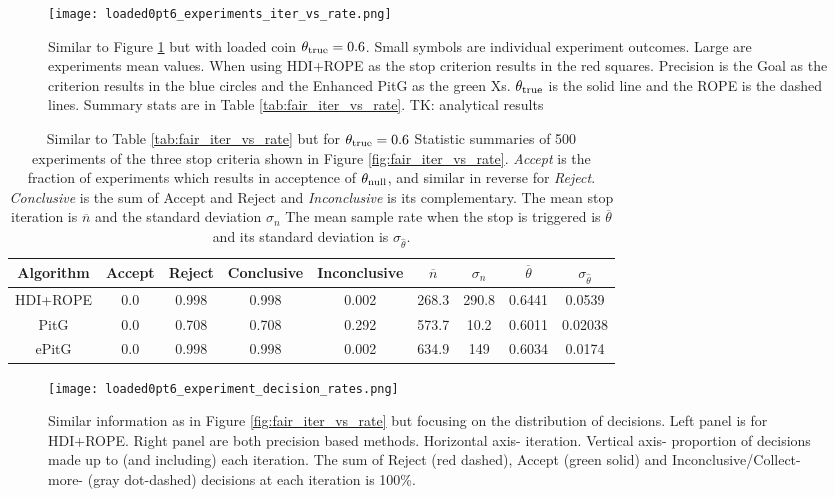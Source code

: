 \begin{figure}[h!]
  \centering
  \texttt{[image: loaded0pt6\_experiments\_iter\_vs\_rate.png]}
  \caption{Similar to Figure \ref{fig:loaded_iter_vs_rate} but with
  loaded coin $\theta_{\rm true}=0.6$.
  Small symbols are individual experiment outcomes. Large are experiments
  mean values. When using HDI+ROPE as the stop criterion results in the red squares.
  Precision is the Goal as the criterion results in the blue circles
  and the Enhanced PitG as the green Xs. $\theta_{\rm true}$ is the solid line and
  the ROPE is the dashed lines. Summary stats are in Table \ref{tab:fair_iter_vs_rate}. TK: analytical results
  }
  \label{fig:loaded_iter_vs_rate}
\end{figure}


\begin{table}[h!]\label{tab:loaded0pt6_iter_vs_rate}
  \begin{center}
  \begin{tabular}{c|c|c|c|c|c|c|c|c}
    \hline
    Algorithm & Accept & Reject & Conclusive & Inconclusive & $\overline{n}$ & $\sigma_n$ & $\overline{\theta}$ & $\sigma_{\hat{\theta}}$\\
    \hline
    HDI+ROPE & 0.0	& 0.998	& 0.998 &	0.002	& 268.3 &	290.8 & 0.6441 &	0.0539 \\
    PitG & 0.0 &	0.708 &	0.708 &	0.292	& 573.7	& 10.2 &	0.6011 &	0.02038 \\
    ePitG & 0.0	& 0.998	& 0.998	& 0.002	& 634.9	& 149	& 0.6034	 & 0.0174 \\
    \hline
  \end{tabular}
  \caption{Similar to Table \ref{tab:fair_iter_vs_rate} but for $\theta_{\rm true}=0.6$ Statistic summaries of 500 experiments of the three stop criteria shown in
  Figure \ref{fig:fair_iter_vs_rate}. {\it Accept}
  is the fraction of experiments which results in acceptence of $\theta_{\rm null}$,
  and similar in reverse for {\it Reject}. {\it Conclusive} is the sum of Accept
  and Reject and {\it Inconclusive} is its complementary.
  The mean stop iteration is $\overline{n}$ and the standard deviation $\sigma_n$
  The mean sample rate when the stop is triggered is $\overline{\theta}$ and its standard deviation is $\sigma_{\hat{\theta}}$.
  }
\end{center}
\end{table}

\begin{figure}[h!]
  \centering
  \texttt{[image: loaded0pt6\_experiment\_decision\_rates.png]}
  \caption{Similar information as in Figure \ref{fig:fair_iter_vs_rate} but focusing on
  the distribution of decisions. Left panel is for HDI+ROPE. Right panel are both
  precision based methods. Horizontal axis- iteration. Vertical axis- proportion of
  decisions made up to (and including) each iteration. The sum of Reject (red dashed),
  Accept (green solid) and Inconclusive/Collect-more- (gray dot-dashed) decisions at
  each iteration is 100\%.
  }
  \label{fig:loaded0pt6_decisions}
\end{figure}